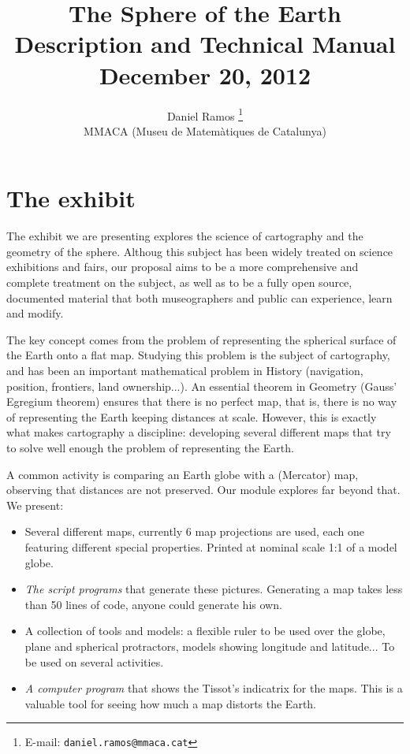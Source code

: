 \documentclass[a4paper,12pt]{article}
\title{The Sphere of the Earth \\ Description and Technical Manual \\ {\small December 20, 2012 } }
\author{Daniel Ramos \footnote{E-mail: \texttt{daniel.ramos@mmaca.cat}}\\MMACA (Museu de Matemàtiques de Catalunya)}
\date{}
\begin{document}
\maketitle

\section{The exhibit}

The exhibit we are presenting explores the science of cartography and the geometry of the sphere. Althoug this subject has been widely treated on science exhibitions and fairs, our proposal aims to be a more comprehensive and complete treatment on the subject, as well as to be a fully open source, documented material that both museographers and public can experience, learn and modify.

The key concept comes from the problem of representing the spherical surface of the Earth onto a flat map. Studying this problem is the subject of cartography, and has been an important mathematical problem in History (navigation, position, frontiers, land ownership...). An essential theorem in Geometry (Gauss' Egregium theorem) ensures that there is no perfect map, that is, there is no way of representing the Earth keeping distances at scale. However, this is exactly what makes cartography a discipline: developing several different maps that try to solve well enough the problem of representing the Earth.

A common activity is comparing an Earth globe with a (Mercator) map, observing that distances are not preserved. Our module explores far beyond that. We present:
\begin{itemize}
 \item Several different maps, currently 6 map projections are used, each one featuring different special properties. Printed at nominal scale 1:1 of a model globe.
 \item \emph{The script programs} that generate these pictures. Generating a map takes less than 50 lines of code, anyone could generate his own.
 \item A collection of tools and models: a flexible ruler to be used over the globe, plane and spherical protractors, models showing longitude and latitude... To be used on several activities.
 \item \emph{A computer program} that shows the Tissot's indicatrix for the maps. This is a valuable tool for seeing how much a map distorts the Earth.
\end{itemize}
\end{document}
